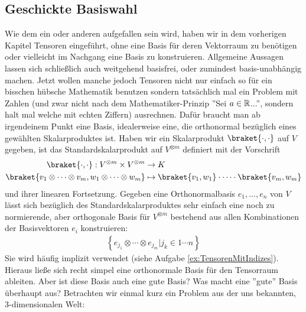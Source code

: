 
\subsection{Geschickte Basiswahl}
Wie dem ein oder anderen aufgefallen sein wird, haben wir in dem vorherigen Kapitel Tensoren eingeführt, ohne eine Basis für deren Vektorraum zu benötigen oder vielleicht im Nachgang eine Basis zu konstruieren. Allgemeine Aussagen lassen sich schließlich auch weitgehend basisfrei, oder zumindest basis-unabhängig machen. 
Jetzt wollen manche jedoch Tensoren nicht nur einfach so für ein bisschen hübsche Mathematik benutzen sondern tatsächlich mal ein Problem mit Zahlen (und zwar nicht nach dem Mathematiker-Prinzip ''Sei $a\in \mathbb{R}$...'', sondern halt mal welche mit echten Ziffern) ausrechnen. Dafür braucht man ab irgendeinem Punkt eine Basis, idealerweise eine, die orthonormal bezüglich eines gewählten Skalarproduktes ist. Haben wir ein Skalarprodukt $\braket{\cdot,\cdot}$ auf $V$ gegeben, ist das Standardskalarprodukt auf $V^{\otimes m}$ definiert mit der Vorschrift
\begin{align}
	\braket{\cdot, \cdot} : V^{\otimes m} \times V^{\otimes m} &\to K\\
	\braket{v_1 \otimes \cdots \otimes v_m, w_1 \otimes \cdots \otimes w_m} &\mapsto \braket{v_1,w_1} \cdot \cdots \cdot \braket{v_m, w_m}
\end{align}
und ihrer linearen Fortsetzung. Gegeben eine Orthonormalbasis $e_1, ..., e_n$ von $V$ lässt sich bezüglich des Standardskalarproduktes sehr einfach eine noch zu normierende, aber orthogonale Basis für $V^{\otimes m}$ bestehend aus allen Kombinationen der Basisvektoren $e_i$ konstruieren: 
\begin{align}
	\left\{e_{j_1}\otimes \cdots \otimes e_{j_m} | j_k \in {1 \cdots n} \right\}
\end{align}
Sie wird häufig implizit verwendet (siehe Aufgabe \ref{ex:TensorenMitIndizes}). Hieraus ließe sich recht simpel eine orthonormale Basis für den Tensorraum ableiten. Aber ist diese Basis auch eine gute Basis? Was macht eine ''gute'' Basis überhaupt aus?
\medbreak
Betrachten wir einmal kurz ein Problem aus der uns bekannten, 3-dimensionalen Welt: 

